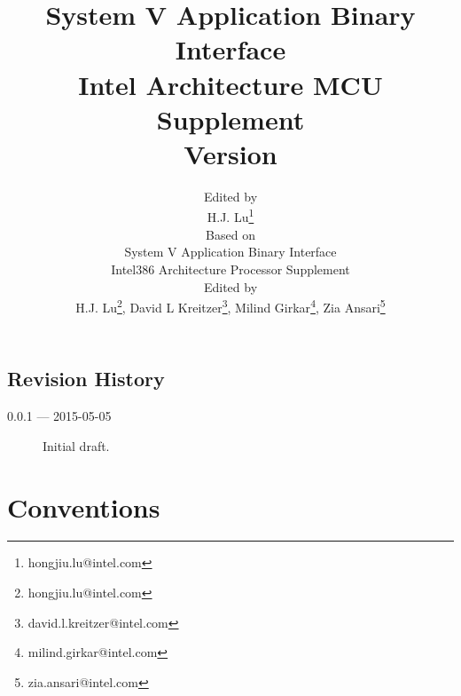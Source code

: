 \documentclass[12pt]{report}
\begin{document}
\author{Edited by\\
  H.J. Lu\thanks{hongjiu.lu@intel.com} \\
  \small
  Based on\\
  \small
  System V Application Binary Interface\\
  \small
  Intel386 Architecture Processor Supplement\\
  \small
  Edited by\\
  \small
  H.J. Lu\thanks{hongjiu.lu@intel.com},
  David L Kreitzer\thanks{david.l.kreitzer@intel.com},
  Milind Girkar\thanks{milind.girkar@intel.com},
  Zia Ansari\thanks{zia.ansari@intel.com}}

\title{System V Application Binary Interface\\
{\Large Intel Architecture MCU Supplement\\
Version \version}}
\maketitle
\tableofcontents
\listoftables
\listoffigures

\section*{Revision History}

\begin{description}

\item[0.0.1 --- 2015-05-05] Initial draft.
\end{description}






\chapter{Conventions}


\appendix

\end{document}
